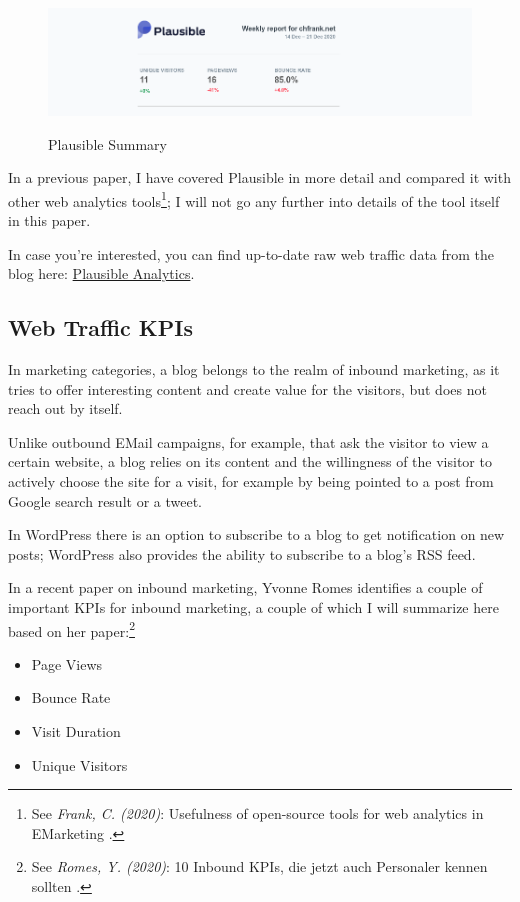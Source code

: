 \begin{figure}[H]
\centering
\caption {Plausible Summary}
\includegraphics[width=\linewidth]{images/plausible.png}
\label{fig:plausibleSummary}
\end{figure}

In a previous paper, I have covered Plausible in more detail and compared it with other web analytics tools\footnote{See \textit{Frank, C. (2020)}: Usefulness of open-source tools for web analytics in EMarketing .\cite{previousPaper}}; I will not go any further into details of the tool itself in this paper.

In case you're interested, you can find up-to-date raw web traffic data from the blog here: \href{https://plausible.io/chfrank.net}{Plausible Analytics}.

\subsection{Web Traffic KPIs}

In marketing categories, a blog belongs to the realm of inbound marketing, as it tries to offer interesting content and create value for the visitors, but does not reach out by itself. 

Unlike outbound EMail campaigns, for example, that ask the visitor to view a certain website, a blog relies on its content and the willingness of the visitor to actively choose the site for a visit, for example by being pointed to a post from Google search result or a tweet.

In WordPress there is an option to subscribe to a blog to get notification on new posts; WordPress also provides the ability to subscribe to a blog's RSS feed.

In a recent paper on inbound marketing, Yvonne Romes identifies a couple of important KPIs for inbound marketing, a couple of which I will summarize here based on her paper:\footnote{See \textit{Romes, Y. (2020)}: 10 Inbound KPIs, die jetzt auch Personaler kennen sollten .\cite{inboundKPI}}

\begin{itemize}
\item Page Views
\item Bounce Rate
\item Visit Duration
\item Unique Visitors
\end{itemize}


